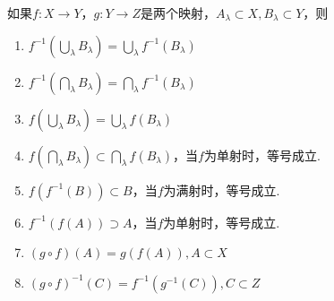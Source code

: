 \begin{proposition}[映射的性质][prop:1.2]
    \wideline
    如果$f:X\to Y$，$g:Y\to Z$是两个映射，$A_\lambda\subset X,B_\lambda \subset Y$，则
    \begin{enumerate}
        \item $f^{-1}\left(\bigcup_{\lambda}{B_\lambda}\right)=\bigcup_{\lambda}{f^{-1}(B_\lambda)}$
        \item $f^{-1}\left(\bigcap_{\lambda}{B_\lambda}\right)=\bigcap_{\lambda}{f^{-1}(B_\lambda)}$
        \item $f\left(\bigcup_{\lambda}{B_\lambda}\right)=\bigcup_{\lambda}{f(B_\lambda)}$
        \item $f\left(\bigcap_{\lambda}{B_\lambda}\right)\subset\bigcap_{\lambda}{f(B_\lambda)}$，当$f$为单射时，等号成立.
        \item $f\left(f^{-1}(B)\right)\subset B$，当$f$为满射时，等号成立.
        \item $f^{-1}\left(f(A)\right)\supset A$，当$f$为单射时，等号成立.
        \item $(g\circ f)(A)=g \left(f(A)\right),A\subset X$
        \item $(g\circ f)^{-1}(C)=f^{-1}\left(g^{-1}(C)\right),C\subset Z$
    \end{enumerate}
\end{proposition}
